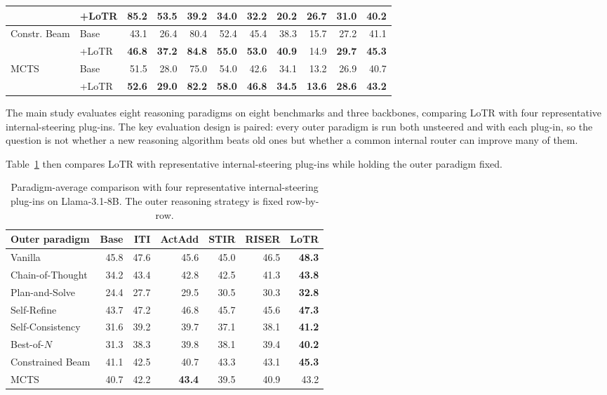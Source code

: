 \documentclass[12pt,a4paper]{article}
\newcommand{\method}[1]{{\sffamily\bfseries\color{MethodBlue}#1}}
\newcommand{\XDB}{\method{XDomainBench}}
\newcommand{\SubspacePath}{\method{SubspacePath Pruner}}
\newcommand{\LoTR}{\method{LoTR}}
\def\method#1{#1}\def\XDB{XDomainBench}\def\SubspacePath{SubspacePath Pruner}%
\begin{document}
\begin{table}[t]
\begin{adjustbox}{max width=\textwidth}
\begin{tabular}{llrrrrrrrrr}
& +\LoTR{} & \textbf{85.2} & \textbf{53.5} & 39.2 & 34.0 & \textbf{32.2} & \textbf{20.2} & \textbf{26.7} & \textbf{31.0} & \textbf{40.2}\\
\midrule
\multirow{2}{*}{Constr. Beam} & Base & 43.1 & 26.4 & 80.4 & 52.4 & 45.4 & 38.3 & 15.7 & 27.2 & 41.1\\
& +\LoTR{} & \textbf{46.8} & \textbf{37.2} & \textbf{84.8} & \textbf{55.0} & \textbf{53.0} & \textbf{40.9} & 14.9 & \textbf{29.7} & \textbf{45.3}\\
\midrule
\multirow{2}{*}{MCTS} & Base & 51.5 & 28.0 & 75.0 & 54.0 & 42.6 & 34.1 & 13.2 & 26.9 & 40.7\\
& +\LoTR{} & \textbf{52.6} & \textbf{29.0} & \textbf{82.2} & \textbf{58.0} & \textbf{46.8} & \textbf{34.5} & \textbf{13.6} & \textbf{28.6} & \textbf{43.2}\\
\bottomrule
\end{tabular}
\end{adjustbox}
\end{table}

The main study evaluates eight reasoning paradigms on eight benchmarks and three backbones, comparing \LoTR{} with four representative internal-steering plug-ins. The key evaluation design is paired: every outer paradigm is run both unsteered and with each plug-in, so the question is not whether a new reasoning algorithm beats old ones but whether a common internal router can improve many of them.

Table~\ref{tab:lotr-main} then compares \LoTR{} with representative internal-steering plug-ins while holding the outer paradigm fixed.
\begin{table}[tbp]
\centering\singlespacing\scriptsize
\caption{Paradigm-average comparison with four representative internal-steering plug-ins on Llama-3.1-8B. The outer reasoning strategy is fixed row-by-row.}
\label{tab:lotr-main}
\setlength{\tabcolsep}{4.0pt}
\begin{tabular}{lrrrrrr}
\toprule
\textbf{Outer paradigm} & \textbf{Base} & \textbf{ITI} & \textbf{ActAdd} & \textbf{STIR} & \textbf{RISER} & \textbf{\LoTR{}}\\
\midrule
Vanilla & 45.8 & 47.6 & 45.6 & 45.0 & 46.5 & \textbf{48.3}\\
Chain-of-Thought & 34.2 & 43.4 & 42.8 & 42.5 & 41.3 & \textbf{43.8}\\
Plan-and-Solve & 24.4 & 27.7 & 29.5 & 30.5 & 30.3 & \textbf{32.8}\\
Self-Refine & 43.7 & 47.2 & 46.8 & 45.7 & 45.6 & \textbf{47.3}\\
Self-Consistency & 31.6 & 39.2 & 39.7 & 37.1 & 38.1 & \textbf{41.2}\\
Best-of-$N$ & 31.3 & 38.3 & 39.8 & 38.1 & 39.4 & \textbf{40.2}\\
Constrained Beam & 41.1 & 42.5 & 40.7 & 43.3 & 43.1 & \textbf{45.3}\\
MCTS & 40.7 & 42.2 & \textbf{43.4} & 39.5 & 40.9 & 43.2\\
\bottomrule
\end{tabular}
\end{table}
\end{document}
